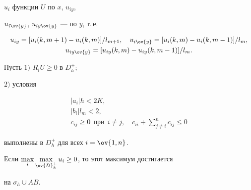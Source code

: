 $u_i$ функции $U$ по $x$, $u_{iy}$,


$u_{i\ov{y}}$, $u_{iy\ov{y}}$ --- по $y$, т.\,е.


\begin{gather*}


u_{iy}=[u_i(k,m+1) - u_i(k,m)]/l_{m+1},\quad


u_{i\ov{y}} = [u_i(k,m) - u_i(k,m-1)]/l_{m}, \\


%


u_{iy\ov{y}} = [u_{iy}(k,m) - u_{iy}(k,m-1)]/l_{m}.


\end{gather*}








\begin{thm}


Пусть $1)$ $R_iU\geq 0$ в ${D}^+_h;$


$2)$ условия


\begin{gather}\label{e1}


|a_i|h < 2K, \\


\label{e2}


|b_i|l_m < 2,\\


\label{e3}


c_{ij}\ge 0 \ \ \text{при} \ \ i\ne j,\quad c_{ii}+


\sum_{j\ne i}^n c_{ij}\leq 0


\end{gather}


выполнены в $D^+_h$ для всех $i=\ov{1,n}$. 


Если $\max \limits_{i}\max \limits_{\ov{D}^+_h} u_i


\geq 0$, то этот максимум достигается


на $\sigma_h \cup AB$.


\end{thm}








